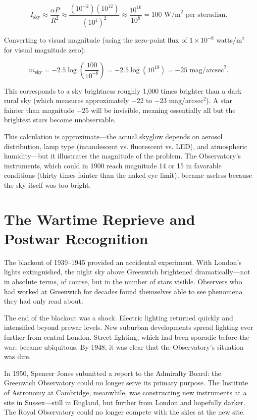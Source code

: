 \[
  I_{\text{sky}} \approx \frac{\alpha P}{R^2} \approx \frac{(10^{-2})(10^{12})}{(10^4)^2} \approx \frac{10^{10}}{10^8} = 100 \text{ W/m}^2 \text{ per steradian}.
\]

Converting to visual magnitude (using the zero-point flux of $1 \times 10^{-8}$ watts/m$^2$ for visual magnitude zero):

\[
  m_{\text{sky}} = -2.5 \log\left(\frac{100}{10^{-8}}\right) = -2.5 \log(10^{10}) = -25 \text{ mag/arcsec}^2.
\]

This corresponds to a sky brightness roughly 1,000 times brighter than a dark rural sky (which measures approximately $-22$ to $-23$ mag/arcsec$^2$). A star fainter than magnitude $-25$ will be invisible, meaning essentially all but the brightest stars become unobservable.

This calculation is approximate—the actual skyglow depends on aerosol distribution, lamp type (incandescent vs. fluorescent vs. LED), and atmospheric humidity—but it illustrates the magnitude of the problem. The Observatory's instruments, which could in 1900 reach magnitude 14 or 15 in favorable conditions (thirty times fainter than the naked eye limit), became useless because the sky itself was too bright.

\section{The Wartime Reprieve and Postwar Recognition}

The blackout of 1939–1945 provided an accidental experiment. With London's lights extinguished, the night sky above Greenwich brightened dramatically—not in absolute terms, of course, but in the number of stars visible. Observers who had worked at Greenwich for decades found themselves able to see phenomena they had only read about.

The end of the blackout was a shock. Electric lighting returned quickly and intensified beyond prewar levels. New suburban developments spread lighting ever further from central London. Street lighting, which had been sporadic before the war, became ubiquitous. By 1948, it was clear that the Observatory's situation was dire.

In 1950, Spencer Jones submitted a report to the Admiralty Board: the Greenwich Observatory could no longer serve its primary purpose. The Institute of Astronomy at Cambridge, meanwhile, was constructing new instruments at a site in Sussex—still in England, but further from London and hopefully darker. The Royal Observatory could no longer compete with the skies at the new site.

